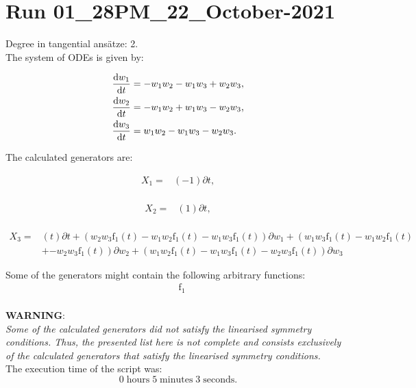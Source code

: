 \section*{Run 01\_28PM\_22\_October-2021}
Degree in tangential ansätze:	2.\\
The system of ODEs is given by:

\begin{align*}
\dv{w_{1}}{t}&=- w_{1} w_{2} - w_{1} w_{3} + w_{2} w_{3},\\
\dv{w_{2}}{t}&=- w_{1} w_{2} + w_{1} w_{3} - w_{2} w_{3},\\
\dv{w_{3}}{t}&=w_{1} w_{2} - w_{1} w_{3} - w_{2} w_{3}.\\
\end{align*}

\noindent The calculated generators are:

\begin{align*}
X_{1}=&\left(-1 \right)\partial t,\\
\end{align*}

\begin{align*}
X_{2}=&\left(1 \right)\partial t,\\
\end{align*}

\begin{align*}
X_{3}=&\left(t \right)\partial t+\left(w_{2} w_{3} \operatorname{f_{1}}{\left(t \right)}- w_{1} w_{2} \operatorname{f_{1}}{\left(t \right)}- w_{1} w_{3} \operatorname{f_{1}}{\left(t \right)} \right)\partial w_{1}+\left(w_{1} w_{3} \operatorname{f_{1}}{\left(t \right)}- w_{1} w_{2} \operatorname{f_{1}}{\left(t \right)}\right.\\
&+\left.- w_{2} w_{3} \operatorname{f_{1}}{\left(t \right)} \right)\partial w_{2}+\left(w_{1} w_{2} \operatorname{f_{1}}{\left(t \right)}- w_{1} w_{3} \operatorname{f_{1}}{\left(t \right)}- w_{2} w_{3} \operatorname{f_{1}}{\left(t \right)} \right)\partial w_{3}
\end{align*}



\noindent Some of the generators might contain the following arbitrary functions:
\begin{align*}
&\operatorname{f_{1}}\\
\end{align*}

\noindent\huge\textbf{WARNING}:\\
\noindent\Large\textit{Some of the calculated generators did not satisfy the linearised symmetry conditions. Thus, the presented list here is not complete and consists exclusively of the calculated generators that satisfy the linearised symmetry conditions.}\normalsize\\[2cm]
\noindent The execution time of the script was:
$$0\;\mathrm{hours}\;5\;\mathrm{minutes}\;3 \;\mathrm{seconds}.$$
